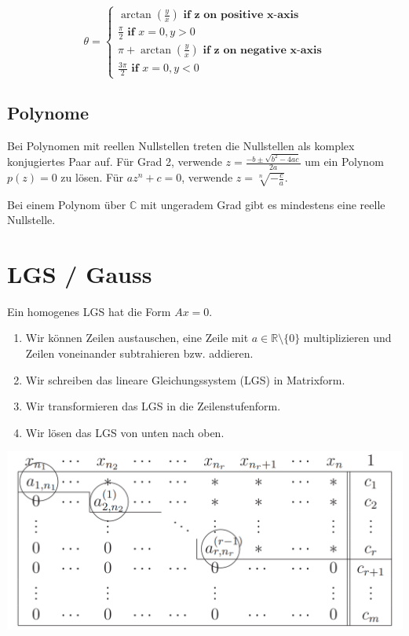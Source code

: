 \documentclass[a4paper,10pt]{article}
\begin{document}
$$
\theta = \begin{cases}
  \arctan(\frac{y}{x}) \textbf{ if z on positive x-axis}\\
  \frac{\pi}{2} \textbf{ if }x=0, y > 0\\
  \pi + \arctan(\frac{y}{x}) \textbf{ if z on negative x-axis}\\
  \frac{3\pi}{2} \textbf{ if }x=0, y < 0
\end{cases}
$$

\subsection{Polynome}

Bei Polynomen mit reellen Nullstellen treten die Nullstellen als komplex konjugiertes Paar auf. Für Grad 2, verwende $z = \frac{-b \pm \sqrt{b^2 - 4ac}}{2a}$ um ein Polynom $p(z) = 0$ zu lösen. Für $a z^n + c = 0$, verwende $z = \sqrt[n]{-\frac{c}{a}}$.

Bei einem Polynom über $\mathbb{C}$ mit ungeradem Grad gibt es mindestens eine reelle Nullstelle.

\section{LGS / Gauss}

Ein homogenes LGS hat die Form $Ax = 0$.

\begin{enumerate}
  \item Wir können Zeilen austauschen, eine Zeile mit $a \in \mathbb{R}\setminus \{0\}$ multiplizieren und Zeilen voneinander subtrahieren bzw. addieren.
  \item Wir schreiben das lineare Gleichungssystem (LGS) in Matrixform.
  \item Wir transformieren das LGS in die Zeilenstufenform.
  \item Wir lösen das LGS von unten nach oben.
\end{enumerate}

\begin{center}
  \includegraphics[width=\linewidth]{gauss.png}
\end{center}
\end{document}
